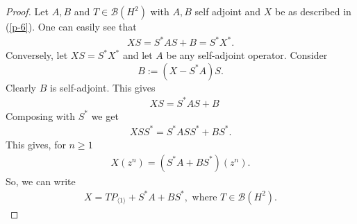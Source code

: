 \documentclass[12pt, reqno]{amsart}
\theoremstyle{definition}
\theoremstyle{remark}
\numberwithin{equation}{section}
\begin{document}
        \begin{proof}
            Let $A,B$ and $T \in \mathcal{B}(H^2)$ with $A,B$ self adjoint and $X$ be as described in (\ref{p-6}). One can easily see that 
            \begin{align*}
                XS=S^*AS+B=S^*X^*.
            \end{align*}
            Conversely, let $XS=S^*X^*$ and let $A$ be any self-adjoint operator. Consider
            \begin{equation*}
                B:=(X-S^*A)S.
            \end{equation*}
            Clearly $B$ is self-adjoint. This gives
            \begin{align*}
                &XS=S^*AS+B
            \end{align*}
            Composing with $S^*$ we get
            \begin{align*}
                XSS^*=S^*ASS^*+BS^*.
            \end{align*}
            This gives, for $n \geq 1$
            \begin{align*}
                X(z^n)=(S^*A+BS^*)(z^n).
            \end{align*}
            So, we can write
            \begin{align*}
                X=TP_{\langle 1 \rangle } +S^*A+BS^*, \text{ where } T \in \mathcal{B}(H^2).
            \end{align*}
        \end{proof}
        
\end{document}
